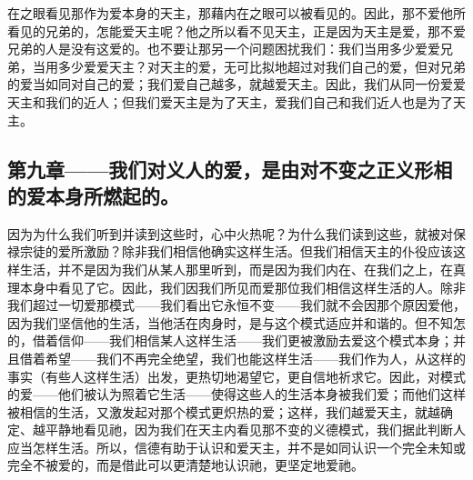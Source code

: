 在之眼看见那作为爱本身的天主，那藉内在之眼可以被看见的。因此，那不爱他所看见的兄弟的，怎能爱天主呢？他之所以看不见天主，正是因为天主是爱，那不爱兄弟的人是没有这爱的。也不要让那另一个问题困扰我们：我们当用多少爱爱兄弟，当用多少爱爱天主？对天主的爱，无可比拟地超过对我们自己的爱，但对兄弟的爱当如同对自己的爱；我们爱自己越多，就越爱天主。因此，我们从同一份爱爱天主和我们的近人；但我们爱天主是为了天主，爱我们自己和我们近人也是为了天主。\par


\subsection{第九章——我们对义人的爱，是由对不变之正义形相的爱本身所燃起的。}

因为为什么我们听到并读到这些时，心中火热呢？为什么我们读到这些，就被对保禄宗徒的爱所激励？除非我们相信他确实这样生活。但我们相信天主的仆役应该这样生活，并不是因为我们从某人那里听到，而是因为我们内在、在我们之上，在真理本身中看见了它。因此，我们因我们所见而爱那位我们相信这样生活的人。除非我们超过一切爱那模式——我们看出它永恒不变——我们就不会因那个原因爱他，因为我们坚信他的生活，当他活在肉身时，是与这个模式适应并和谐的。但不知怎的，借着信仰——我们相信某人这样生活——我们更被激励去爱这个模式本身；并且借着希望——我们不再完全绝望，我们也能这样生活——我们作为人，从这样的事实（有些人这样生活）出发，更热切地渴望它，更自信地祈求它。因此，对模式的爱——他们被认为照着它生活——使得这些人的生活本身被我们爱；而他们这样被相信的生活，又激发起对那个模式更炽热的爱；这样，我们越爱天主，就越确定、越平静地看见祂，因为我们在天主内看见那不变的义德模式，我们据此判断人应当怎样生活。所以，信德有助于认识和爱天主，并不是如同认识一个完全未知或完全不被爱的，而是借此可以更清楚地认识祂，更坚定地爱祂。\par


